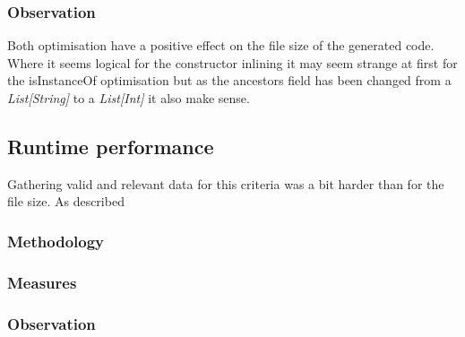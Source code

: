 \subsubsection{Observation}
Both optimisation have a positive effect on the file size of the generated
code. Where it seems logical for the constructor inlining it may seem
strange at first for the isInstanceOf optimisation but as the ancestors field
has been changed from a \emph{List[String]} to a \emph{List[Int]} it also make
sense.


\subsection{Runtime performance}
Gathering valid and relevant data for this criteria was a bit harder than for
the file size. As described 

\subsubsection{Methodology}

\subsubsection{Measures}

\subsubsection{Observation}
